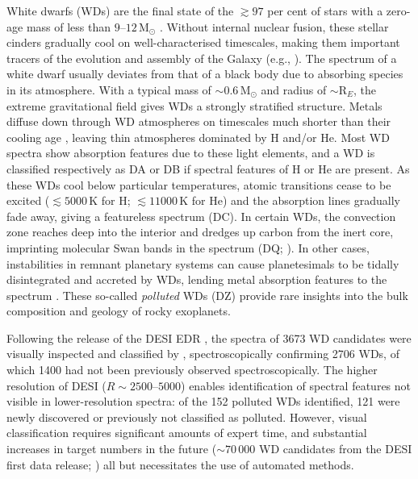 \documentclass[fleqn,usenatbib]{mnras}
\begin{document}
White dwarfs (WDs) are the final state of the $\gtrsim97$ per cent of stars with a zero-age mass of less than $9$--$12\,\mathrm{M}_\odot$ \citep{lauffer18, althaus10, althaus21}.
Without internal nuclear fusion, these stellar cinders gradually cool on well-characterised timescales, making them important tracers of the evolution and assembly of the Galaxy (e.g., \citealt{winget87, tremblay14}).
The spectrum of a white dwarf usually deviates from that of a black body due to absorbing species in its atmosphere.
With a typical mass of $\sim0.6\,\mathrm{M}_\odot$ and radius of $\sim \mathrm{R}_E$, the extreme gravitational field gives WDs a strongly stratified structure.
Metals diffuse down through WD atmospheres on timescales much shorter than their cooling age \citep{schatzman45, paquette86, koester09, wyatt14}, leaving thin atmospheres dominated by H and/or He.
Most WD spectra show absorption features due to these light elements, and a WD is classified respectively as DA or DB if spectral features of H or He are present.
As these WDs cool below particular temperatures, atomic transitions cease to be excited ($\lesssim5000\,\text{K}$ for H; $\lesssim 11000\,\text{K}$ for He) and the absorption lines gradually fade away, giving a featureless spectrum (DC).
In certain WDs, the convection zone reaches deep into the interior and dredges up carbon from the inert core, imprinting molecular  Swan bands in the spectrum (DQ; \citealt{fontaine84, koester82, koester20, blouin23}).
In other cases, instabilities in remnant planetary systems can cause planetesimals to be tidally disintegrated and accreted by WDs, lending metal absorption features to the spectrum \citep{bonsor11, frewen14, mustill18, maldonado20}.
These so-called \textit{polluted} WDs (DZ) provide rare insights into the bulk composition and geology of rocky exoplanets.

Following the release of the DESI EDR \citep{desiedr}, the spectra of 3673 WD candidates were visually inspected and classified by \citet{manser24}, spectroscopically confirming 2706 WDs, of which 1400 had not been previously observed spectroscopically.
The higher resolution of DESI ($R\sim2500$--$5000$) enables identification of spectral features not visible in lower-resolution spectra: of the 152 polluted WDs identified, 121 were newly discovered or previously not classified as polluted.
However, visual classification requires significant amounts of expert time, and substantial increases in target numbers in the future ($\sim70\,000$ WD candidates from the DESI first data release; \citealt{cooper23}) all but necessitates the use of automated methods.
\end{document}

